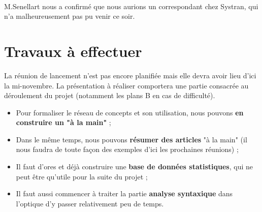 \documentclass{article}           %
\begin{document}
\paragraph{}
M.Senellart nous a confirmé que nous aurions un correspondant chez Systran, qui n'a malheureusement pas pu venir ce soir.

\section{Travaux à effectuer}

La réunion de lancement n'est pas encore planifiée mais elle devra avoir lieu d'ici la mi-novembre. La présentation à réaliser comportera une partie consacrée au déroulement du projet (notamment les plans B en cas de difficulté).\\

\begin{itemize}
 \item Pour formaliser le réseau de concepts et son utilisation, nous pouvons \textbf{en construire un "à la main"} ;
 \item Dans le même temps, nous pouvons \textbf{résumer des articles} "à la main" (il nous faudra de toute façon des exemples d'ici les prochaines réunions) ;
 \item Il faut d'ores et déjà construire une \textbf{base de données statistiques}, qui ne peut être qu'utile pour la suite du projet ;
 \item Il faut aussi commencer à traiter la partie \textbf{analyse syntaxique} dans l'optique d'y passer relativement peu de temps.
\end{itemize}
\end{document}
